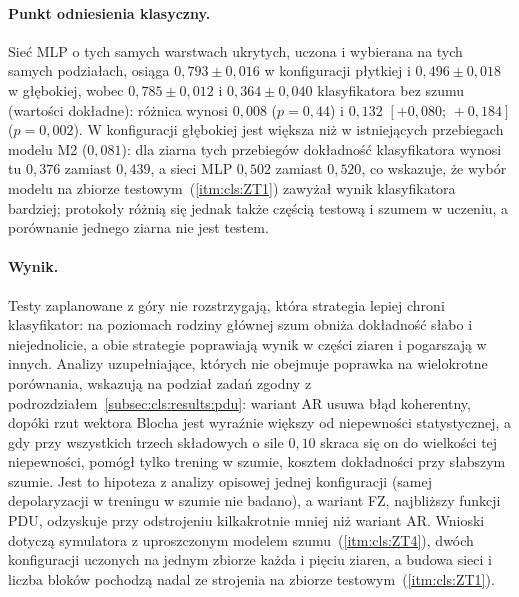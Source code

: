 \paragraph{Punkt odniesienia klasyczny.}
Sieć MLP o tych samych warstwach ukrytych, uczona i wybierana na tych samych podziałach, osiąga $0{,}793\pm0{,}016$ w konfiguracji płytkiej i $0{,}496\pm0{,}018$ w głębokiej, wobec $0{,}785\pm0{,}012$ i $0{,}364\pm0{,}040$ klasyfikatora bez szumu (wartości dokładne): różnica wynosi $0{,}008$ ($p=0{,}44$) i $0{,}132$ $[+0{,}080;\,+0{,}184]$ ($p=0{,}002$).
W konfiguracji głębokiej jest większa niż w istniejących przebiegach modelu M2 ($0{,}081$): dla ziarna tych przebiegów dokładność klasyfikatora wynosi tu $0{,}376$ zamiast $0{,}439$, a sieci MLP $0{,}502$ zamiast $0{,}520$, co wskazuje, że wybór modelu na zbiorze testowym~(\ref{itm:cls:ZT1}) zawyżał wynik klasyfikatora bardziej; protokoły różnią się jednak także częścią testową i szumem w uczeniu, a porównanie jednego ziarna nie jest testem.

\paragraph{Wynik.}
Testy zaplanowane z góry nie rozstrzygają, która strategia lepiej chroni klasyfikator: na poziomach rodziny głównej szum obniża dokładność słabo i niejednolicie, a obie strategie poprawiają wynik w części ziaren i pogarszają w innych.
Analizy uzupełniające, których nie obejmuje poprawka na wielokrotne porównania, wskazują na podział zadań zgodny z podrozdziałem~\ref{subsec:cls:results:pdu}: wariant AR usuwa błąd koherentny, dopóki rzut wektora Blocha jest wyraźnie większy od niepewności statystycznej, a gdy przy wszystkich trzech składowych o sile $0{,}10$ skraca się on do wielkości tej niepewności, pomógł tylko trening w szumie, kosztem dokładności przy słabszym szumie.
Jest to hipoteza z analizy opisowej jednej konfiguracji (samej depolaryzacji w treningu w szumie nie badano), a wariant FZ, najbliższy funkcji PDU, odzyskuje przy odstrojeniu kilkakrotnie mniej niż wariant AR.
Wnioski dotyczą symulatora z uproszczonym modelem szumu~(\ref{itm:cls:ZT4}), dwóch konfiguracji uczonych na jednym zbiorze każda i pięciu ziaren, a budowa sieci i liczba bloków pochodzą nadal ze strojenia na zbiorze testowym~(\ref{itm:cls:ZT1}).

